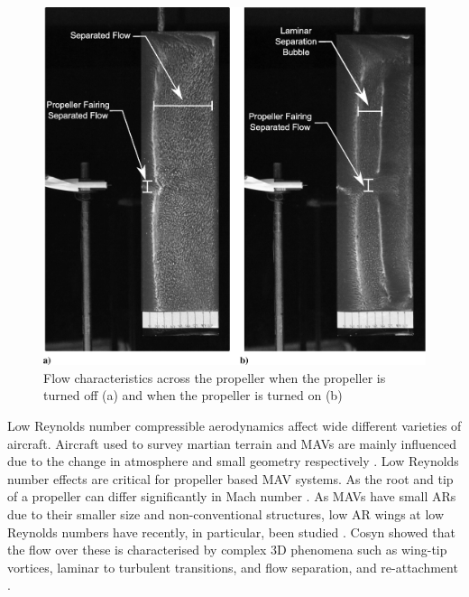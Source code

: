 \begin{figure}[H]
  \centering
  \includegraphics[width=0.8\linewidth]{03_LiteratureReview/Figs/blades.jpeg}
  \caption{Flow characteristics across the propeller when the propeller is turned off (a) and when the propeller is turned on (b) \cite{Ananda2018}}
  \label{fig:bladeslow}
\end{figure}




Low Reynolds number compressible aerodynamics affect wide different varieties of aircraft. Aircraft used to survey martian terrain and MAVs are mainly influenced due to the change in atmosphere and small geometry respectively \cite{Munday2015}. Low Reynolds number effects are critical for propeller based MAV systems. As the root and tip of a propeller can differ significantly in Mach number \cite{Munday2015}. As MAVs have small ARs due to their smaller size and non-conventional structures, low AR wings at low Reynolds numbers have recently, in particular, been studied \cite{Bhat2019} \cite{Torres2012}. Cosyn showed that the flow over these is characterised by complex 3D phenomena such as wing-tip vortices, laminar to turbulent transitions, and flow separation, and re-attachment \cite{Cosyn2012}.

